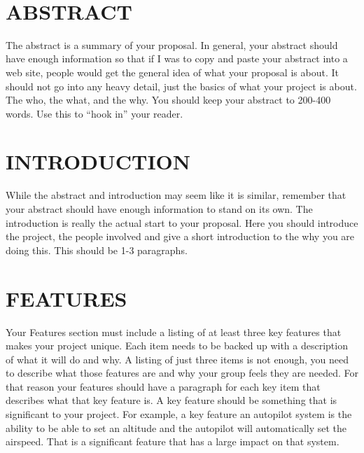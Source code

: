 \documentclass[12pt]{article}
\begin{document}
\begin{titlepage}
\begin{minipage}{0.8\textwidth}
\begin{flushleft}
		\end{flushleft}
	\end{minipage}\\[2 cm]
	
	\vfill
	
\end{titlepage}

\tableofcontents
\pagebreak

\section{ABSTRACT}
The abstract is a summary of your proposal. In general, your abstract should have enough information so that if I was to copy and paste your abstract into a web site, people would get the general idea of what your proposal is about. It should not go into any heavy detail, just the basics of what your project is about. The who, the what, and the why. You should keep your abstract to 200-400 words. Use this to ``hook in'' your reader.

\section{INTRODUCTION}
While the abstract and introduction may seem like it is similar, remember that your abstract should have enough information to stand on its own. The introduction is really the actual start to your proposal. Here you should introduce the project, the people involved and give a short introduction to the why you are doing this. This should be 1-3 paragraphs.

\section{FEATURES}
Your Features section must include a listing of at least three key features that makes your project unique. Each item needs to be backed up with a description of what it will do and why. A listing of just three items is not enough, you need to describe what those features are and why your group feels they are needed. For that reason your features should have a paragraph for each key item that describes what that key feature is. A key feature should be something that is significant to your project. For example, a key feature an autopilot system is the ability to be able to set an altitude and the autopilot will automatically set the airspeed. That is a significant feature that has a large impact on that system.
\end{document}
